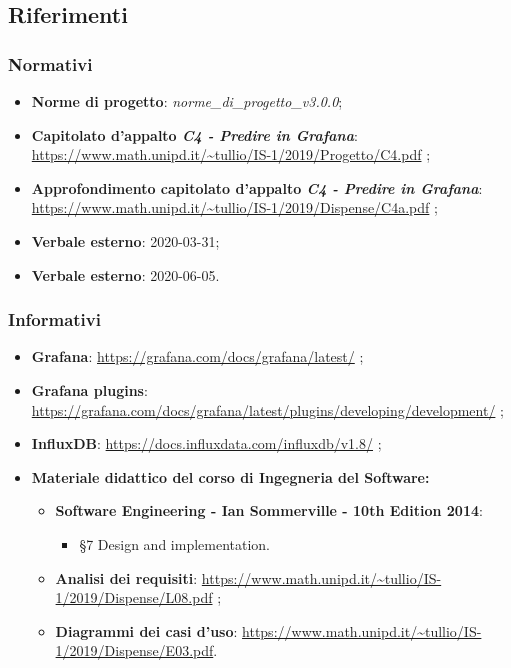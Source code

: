 \subsection{Riferimenti}
		\subsubsection{Normativi}
			\begin{itemize}
				\item \textbf{Norme di progetto}: \emph{norme\_di\_progetto\_v3.0.0};
				\item \textbf{Capitolato d'appalto \emph{C4 - Predire in Grafana}}: \url{https://www.math.unipd.it/~tullio/IS-1/2019/Progetto/C4.pdf} ;
				\item \textbf{Approfondimento capitolato d'appalto \emph{C4 - Predire in Grafana}}: \url{https://www.math.unipd.it/~tullio/IS-1/2019/Dispense/C4a.pdf} ;
				\item \textbf{Verbale esterno}: 2020-03-31;
				\item \textbf{Verbale esterno}: 2020-06-05.
			\end{itemize}
		
		\subsubsection{Informativi}
			\begin{itemize}
			\item \textbf{Grafana}: \url{https://grafana.com/docs/grafana/latest/} ;
			\item \textbf{Grafana plugins}: \url{https://grafana.com/docs/grafana/latest/plugins/developing/development/} ;
			\item \textbf{InfluxDB}: \url{https://docs.influxdata.com/influxdb/v1.8/} ;

			\item \textbf{Materiale didattico del corso di Ingegneria del Software:}
			\begin{itemize}
				\item \textbf{Software Engineering - Ian Sommerville - 10th Edition 2014}: \begin{itemize}
				\item \S 7 Design and implementation.
				\end{itemize}
				\item \textbf{Analisi dei requisiti}: \url{https://www.math.unipd.it/~tullio/IS-1/2019/Dispense/L08.pdf} ;				\item \textbf{Diagrammi dei casi d'uso}: \url{https://www.math.unipd.it/~tullio/IS-1/2019/Dispense/E03.pdf}.
					
				\end{itemize}
			\end{itemize}				
